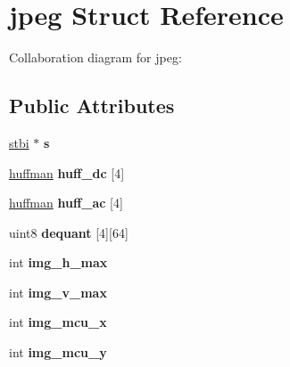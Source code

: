 \hypertarget{structjpeg}{\section{jpeg Struct Reference}
\label{structjpeg}
}


Collaboration diagram for jpeg\+:
\subsection*{Public Attributes}
\begin{DoxyCompactItemize}
\item 
\hypertarget{structjpeg_aa1dac6b3ea069114abf0b4021aa3a67e}{\hyperlink{structstbi}{stbi} $\ast$ {\bfseries s}}\label{structjpeg_aa1dac6b3ea069114abf0b4021aa3a67e}

\item 
\hypertarget{structjpeg_aae44f91bafcc73fa70544573458abe33}{\hyperlink{structhuffman}{huffman} {\bfseries huff\+\_\+dc} \mbox{[}4\mbox{]}}\label{structjpeg_aae44f91bafcc73fa70544573458abe33}

\item 
\hypertarget{structjpeg_a6fab0b2d90425db5d609edbde8bddd92}{\hyperlink{structhuffman}{huffman} {\bfseries huff\+\_\+ac} \mbox{[}4\mbox{]}}\label{structjpeg_a6fab0b2d90425db5d609edbde8bddd92}

\item 
\hypertarget{structjpeg_aae820981dde2c49bc05b6e1298143d21}{uint8 {\bfseries dequant} \mbox{[}4\mbox{]}\mbox{[}64\mbox{]}}\label{structjpeg_aae820981dde2c49bc05b6e1298143d21}

\item 
\hypertarget{structjpeg_af4ed1173241e83f1482a276a178ce9e5}{int {\bfseries img\+\_\+h\+\_\+max}}\label{structjpeg_af4ed1173241e83f1482a276a178ce9e5}

\item 
\hypertarget{structjpeg_a50690c7d415968f864f4f1c10b85082d}{int {\bfseries img\+\_\+v\+\_\+max}}\label{structjpeg_a50690c7d415968f864f4f1c10b85082d}

\item 
\hypertarget{structjpeg_a8a7f2486617a69e9b88c9a161560c8a5}{int {\bfseries img\+\_\+mcu\+\_\+x}}\label{structjpeg_a8a7f2486617a69e9b88c9a161560c8a5}

\item 
\hypertarget{structjpeg_afa9d2c991eff0959c0c8b65ab186243b}{int {\bfseries img\+\_\+mcu\+\_\+y}}\label{structjpeg_afa9d2c991eff0959c0c8b65ab186243b}


\end{DoxyCompactItemize}
